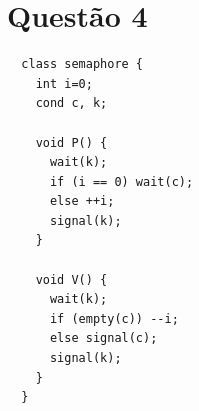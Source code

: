 \documentclass{amsart}
\theoremstyle{plain}
\numberwithin{equation}{section}
\begin{document}
\section*{Questão 4}

\begin{lstlisting}
  class semaphore {
    int i=0;
    cond c, k;

    void P() {
      wait(k);
      if (i == 0) wait(c);
      else ++i;
      signal(k);
    }

    void V() {
      wait(k);
      if (empty(c)) --i;
      else signal(c);
      signal(k);
    }
  }
\end{lstlisting}


\newpage
\appendix

\newpage

\printbibliography[]
\end{document}

